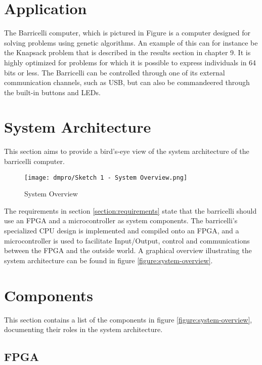 

\section{Application}

The Barricelli computer, which is pictured in Figure is a computer designed for solving problems using genetic algorithms.
An example of this can for instance be the Knapsack problem that is described in the results section in chapter 9.
It is highly optimized for problems for which it is possible to express individuals in 64 bits or less.
The Barricelli can be controlled through one of its external communication channels, such as USB, but can also be commandeered through the built-in buttons and LEDs.



\section{System Architecture}

This section aims to provide a bird's-eye view of the system architecture of the \Gls{barricelli} computer.

\begin{figure}[H]
\texttt{[image: dmpro/Sketch 1 - System Overview.png]}
\caption{System Overview}
\label{figure:system-overview}
\end{figure}

The requirements in section \vref{section:requirements} state that the \Gls{barricelli} should use an \gls{FPGA} and a microcontroller as system components.
The \Gls{barricelli}'s specialized CPU design is implemented and compiled onto an \gls{FPGA}, and a microcontroller is used to facilitate Input/Output, control and communications between the \gls{FPGA} and the outside world.
A graphical overview illustrating the system architecture can be found in figure \vref{figure:system-overview}.

\section{Components}

This section contains a list of the components in figure \vref{figure:system-overview}, documenting their roles in the system architecture.

\subsection{\gls{FPGA}}

